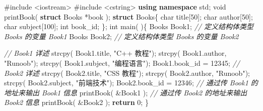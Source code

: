 \documentclass[
]{article}
\newenvironment{Shaded}{}{}
\newcommand{\CommentTok}[1]{\textcolor[rgb]{0.38,0.63,0.69}{\textit{#1}}}
\newcommand{\ControlFlowTok}[1]{\textcolor[rgb]{0.00,0.44,0.13}{\textbf{#1}}}
\newcommand{\DataTypeTok}[1]{\textcolor[rgb]{0.56,0.13,0.00}{#1}}
\newcommand{\DecValTok}[1]{\textcolor[rgb]{0.25,0.63,0.44}{#1}}
\newcommand{\ImportTok}[1]{#1}
\newcommand{\KeywordTok}[1]{\textcolor[rgb]{0.00,0.44,0.13}{\textbf{#1}}}
\newcommand{\NormalTok}[1]{#1}
\newcommand{\OperatorTok}[1]{\textcolor[rgb]{0.40,0.40,0.40}{#1}}
\newcommand{\PreprocessorTok}[1]{\textcolor[rgb]{0.74,0.48,0.00}{#1}}
\newcommand{\StringTok}[1]{\textcolor[rgb]{0.25,0.44,0.63}{#1}}
\begin{document}
\begin{Shaded}
\begin{Highlighting}[]
\PreprocessorTok{\#include }\ImportTok{\textless{}iostream\textgreater{}}
\PreprocessorTok{\#include }\ImportTok{\textless{}cstring\textgreater{}}
\KeywordTok{using} \KeywordTok{namespace}\NormalTok{ std}\OperatorTok{;}
\DataTypeTok{void}\NormalTok{ printBook}\OperatorTok{(} \KeywordTok{struct}\NormalTok{ Books }\OperatorTok{*}\NormalTok{book }\OperatorTok{);} 
\KeywordTok{struct}\NormalTok{ Books}\OperatorTok{\{}
   \DataTypeTok{char}\NormalTok{  title}\OperatorTok{[}\DecValTok{50}\OperatorTok{];}   
   \DataTypeTok{char}\NormalTok{  author}\OperatorTok{[}\DecValTok{50}\OperatorTok{];}   
   \DataTypeTok{char}\NormalTok{  subject}\OperatorTok{[}\DecValTok{100}\OperatorTok{];}   
   \DataTypeTok{int}\NormalTok{   book\_id}\OperatorTok{;}
\OperatorTok{\};} 
\DataTypeTok{int}\NormalTok{ main}\OperatorTok{(} \OperatorTok{)\{}
\NormalTok{   Books Book1}\OperatorTok{;}        \CommentTok{// 定义结构体类型 Books 的变量 Book1}
\NormalTok{   Books Book2}\OperatorTok{;}        \CommentTok{// 定义结构体类型 Books 的变量 Book2}
 
    \CommentTok{// Book1 详述}
\NormalTok{   strcpy}\OperatorTok{(}\NormalTok{ Book1}\OperatorTok{.}\NormalTok{title}\OperatorTok{,} \StringTok{"C++ 教程"}\OperatorTok{);}   
\NormalTok{   strcpy}\OperatorTok{(}\NormalTok{ Book1}\OperatorTok{.}\NormalTok{author}\OperatorTok{,} \StringTok{"Runoob"}\OperatorTok{);} 
\NormalTok{   strcpy}\OperatorTok{(}\NormalTok{ Book1}\OperatorTok{.}\NormalTok{subject}\OperatorTok{,} \StringTok{"编程语言"}\OperatorTok{);}   
\NormalTok{   Book1}\OperatorTok{.}\NormalTok{book\_id }\OperatorTok{=} \DecValTok{12345}\OperatorTok{;} 
   \CommentTok{// Book2 详述}
\NormalTok{   strcpy}\OperatorTok{(}\NormalTok{ Book2}\OperatorTok{.}\NormalTok{title}\OperatorTok{,} \StringTok{"CSS 教程"}\OperatorTok{);}   
\NormalTok{   strcpy}\OperatorTok{(}\NormalTok{ Book2}\OperatorTok{.}\NormalTok{author}\OperatorTok{,} \StringTok{"Runoob"}\OperatorTok{);}   
\NormalTok{   strcpy}\OperatorTok{(}\NormalTok{ Book2}\OperatorTok{.}\NormalTok{subject}\OperatorTok{,} \StringTok{"前端技术"}\OperatorTok{);}   
\NormalTok{   Book2}\OperatorTok{.}\NormalTok{book\_id }\OperatorTok{=} \DecValTok{12346}\OperatorTok{;} 
   \CommentTok{// 通过传 Book1 的地址来输出 Book1 信息}
\NormalTok{   printBook}\OperatorTok{(} \OperatorTok{\&}\NormalTok{Book1 }\OperatorTok{);} 
   \CommentTok{// 通过传 Book2 的地址来输出 Book2 信息}
\NormalTok{   printBook}\OperatorTok{(} \OperatorTok{\&}\NormalTok{Book2 }\OperatorTok{);} 
   \ControlFlowTok{return} \DecValTok{0}\OperatorTok{;}
\OperatorTok{\}}


\end{Highlighting}
\end{Shaded}
\end{document}
